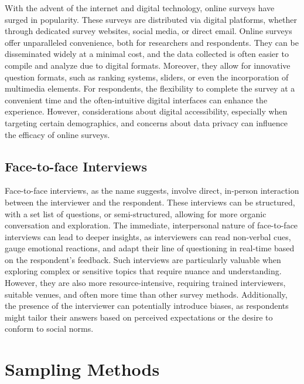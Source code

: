 \documentclass[
  b5paper]{book}
\begin{document}
With the advent of the internet and digital technology, online surveys have surged in popularity. These surveys are distributed via digital platforms, whether through dedicated survey websites, social media, or direct email. Online surveys offer unparalleled convenience, both for researchers and respondents. They can be disseminated widely at a minimal cost, and the data collected is often easier to compile and analyze due to digital formats. Moreover, they allow for innovative question formats, such as ranking systems, sliders, or even the incorporation of multimedia elements. For respondents, the flexibility to complete the survey at a convenient time and the often-intuitive digital interfaces can enhance the experience. However, considerations about digital accessibility, especially when targeting certain demographics, and concerns about data privacy can influence the efficacy of online surveys.

\hypertarget{face-to-face-interviews}{%
\subsection*{Face-to-face Interviews}\label{face-to-face-interviews}}

Face-to-face interviews, as the name suggests, involve direct, in-person interaction between the interviewer and the respondent. These interviews can be structured, with a set list of questions, or semi-structured, allowing for more organic conversation and exploration. The immediate, interpersonal nature of face-to-face interviews can lead to deeper insights, as interviewers can read non-verbal cues, gauge emotional reactions, and adapt their line of questioning in real-time based on the respondent's feedback. Such interviews are particularly valuable when exploring complex or sensitive topics that require nuance and understanding. However, they are also more resource-intensive, requiring trained interviewers, suitable venues, and often more time than other survey methods. Additionally, the presence of the interviewer can potentially introduce biases, as respondents might tailor their answers based on perceived expectations or the desire to conform to social norms.

\hypertarget{sampling-methods}{%
\section{Sampling Methods}\label{sampling-methods}}
\end{document}
